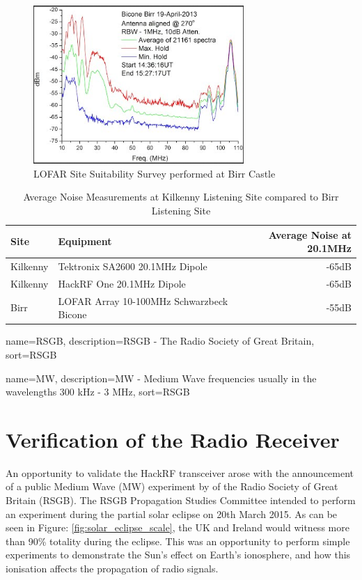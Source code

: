\documentclass[runningheads,a4paper]{llncs}
\begin{document}
%
\begin{figure}[here]
\centering
\includegraphics[width=8cm]{images/35}
\caption{LOFAR Site Suitability Survey performed at Birr Castle \citep{craf-13}}
\label{fig:site_survey_lofar}
\end{figure}
%

%
\begin{table}
  \centering
  \begin{tabular}{p{2cm} l r}
    \toprule
    Site & Equipment & Average Noise at 20.1MHz \\ \midrule
    Kilkenny & Tektronix SA2600 20.1MHz Dipole & -65dB  \\
    Kilkenny & HackRF One 20.1MHz Dipole & -65dB \\
    Birr & LOFAR Array 10-100MHz Schwarzbeck Bicone & -55dB \\
    \bottomrule
  \end{tabular}
  \caption{Average Noise Measurements at Kilkenny Listening Site compared to Birr Listening Site \citep{craf-13}}
  \label{tab:site_survey}
\end{table}
%

{
  name={RSGB},
  description={RSGB - The Radio Society of Great Britain},
  sort=RSGB
}

{
  name={MW},
  description={MW - Medium Wave frequencies usually in the wavelengths 300 kHz - 3 MHz},
  sort=RSGB
}

\section*{Verification of the Radio Receiver}
An opportunity to validate the HackRF transceiver arose with the announcement of a public Medium Wave (\gls{MW}) experiment by \cite{RSGB-15-b} of the Radio Society of Great Britain (\gls{RSGB}). The \gls{RSGB} Propagation Studies Committee intended to perform an experiment during the partial solar eclipse on 20th March 2015. As can be seen in Figure: \ref{fig:solar_eclipse_scale}, the UK and Ireland would witness more than 90\% totality during the eclipse. This was an opportunity to perform simple experiments to demonstrate the Sun's effect on Earth's ionosphere, and how this ionisation affects the propagation of radio signals.
\end{document}
